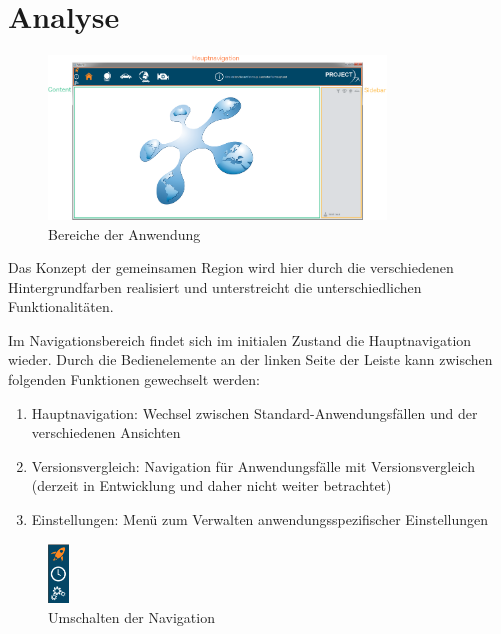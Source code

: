 \section{Analyse}
\begin{figure}[H]
 \centering
 \includegraphics[width=0.8\textwidth]{grafiken/areas.png}
 \caption{Bereiche der Anwendung}
 \label{fig:areas}
\end{figure}
Das Konzept der gemeinsamen Region wird hier durch die verschiedenen Hintergrundfarben realisiert und unterstreicht die unterschiedlichen Funktionalitäten.\par
{}
Im Navigationsbereich findet sich im initialen Zustand die Hauptnavigation wieder. Durch die Bedienelemente an der linken Seite der Leiste kann zwischen folgenden Funktionen gewechselt werden:
\begin{enumerate}
	\item Hauptnavigation: Wechsel zwischen Standard-Anwendungsfällen und der verschiedenen Ansichten
	\item Versionsvergleich: Navigation für Anwendungsfälle mit Versionsvergleich (derzeit in Entwicklung und daher nicht weiter betrachtet)
	\item Einstellungen: Menü zum Verwalten anwendungsspezifischer Einstellungen
\end{enumerate}
\begin{figure}[H]
 \centering
 \includegraphics[width=0.05\textwidth]{grafiken/ribbon.png}
 \caption{Umschalten der Navigation}
 \label{fig:ribbon}
\end{figure}
